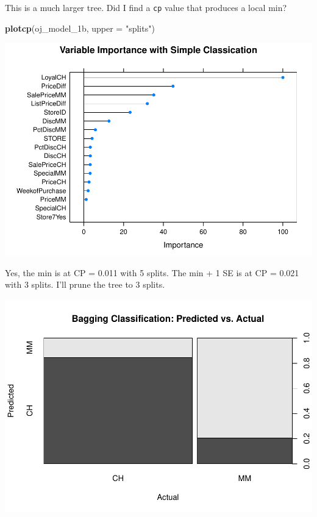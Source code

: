\documentclass[
]{book}
\newenvironment{Shaded}{\begin{snugshade}}{\end{snugshade}}
\newcommand{\DataTypeTok}[1]{\textcolor[rgb]{0.13,0.29,0.53}{#1}}
\newcommand{\DecValTok}[1]{\textcolor[rgb]{0.00,0.00,0.81}{#1}}
\newcommand{\KeywordTok}[1]{\textcolor[rgb]{0.13,0.29,0.53}{\textbf{#1}}}
\newcommand{\NormalTok}[1]{#1}
\newcommand{\OperatorTok}[1]{\textcolor[rgb]{0.81,0.36,0.00}{\textbf{#1}}}
\newcommand{\OtherTok}[1]{\textcolor[rgb]{0.56,0.35,0.01}{#1}}
\newcommand{\StringTok}[1]{\textcolor[rgb]{0.31,0.60,0.02}{#1}}
\begin{document}
This is a much larger tree. Did I find a \texttt{cp} value that produces a local min?

\begin{Shaded}
\begin{Highlighting}[]
\KeywordTok{plotcp}\NormalTok{(oj_model_1b, }\DataTypeTok{upper =} \StringTok{"splits"}\NormalTok{)}
\end{Highlighting}
\end{Shaded}

\includegraphics{data-sci_files/figure-latex/unnamed-chunk-57-1.pdf}

Yes, the min is at CP = 0.011 with 5 splits. The min + 1 SE is at CP = 0.021 with 3 splits. I'll prune the tree to 3 splits.

\begin{Shaded}
\end{Shaded}

\includegraphics{data-sci_files/figure-latex/unnamed-chunk-58-1.pdf}
\end{document}
